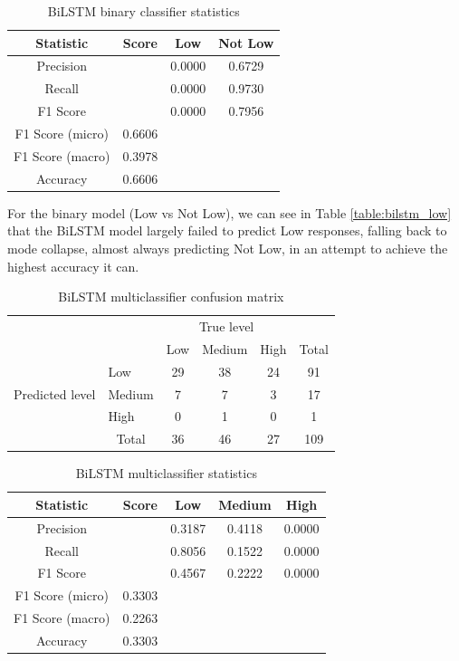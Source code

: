 \documentclass[12pt, a4paper]{article}
\begin{document}
\begin{table}[ht]
\centering
\begin{tabular}{||c c c c||} 
 \hline
 Statistic & Score & Low & Not Low  \\ [0.5ex] 
 \hline\hline
 Precision &  & 0.0000 & 0.6729 \\ 
 Recall & & 0.0000 & 0.9730 \\
 F1 Score &  & 0.0000 & 0.7956 \\
 F1 Score (micro) & 0.6606 & & \\
 F1 Score (macro)  & 0.3978 & &  \\ 
 Accuracy  & 0.6606 & & \\ [1ex] 
 \hline
\end{tabular}
\caption{BiLSTM binary classifier statistics}
\label{table:bilstmstat_low}
\end{table}

For the binary model (Low vs Not Low), we can see in Table \ref{table:bilstm_low} that the BiLSTM model largely failed to predict Low responses, falling back to mode collapse, almost always predicting Not Low, in an attempt to achieve the highest accuracy it can.

\begin{table}[ht]
\centering
\begin{tabular}{l|l|c|c|c|c}
\multicolumn{2}{c}{}&\multicolumn{3}{c}{True level}&\\
\cline{3-5}
\multicolumn{2}{c|}{}&Low&Medium&High&\multicolumn{1}{c}{Total}\\
\cline{2-5}
\multirow{3}{*}{Predicted level}& Low & 29 & 38 & 24 & 91\\
\cline{2-5}
& Medium & 7 & 7 & 3 & 17\\
\cline{2-5}
& High & 0 & 1 & 0 & 1\\
\cline{2-5}
\multicolumn{1}{c}{} & \multicolumn{1}{c}{Total} & \multicolumn{1}{c}{36} & \multicolumn{    1}{c}{46} & \multicolumn{    1}{c}{27} & \multicolumn{1}{c}{109}\\
\end{tabular}

\caption{BiLSTM multiclassifier confusion matrix}
\label{table:bilstm}
\end{table}

\begin{table}[ht]
\centering
\begin{tabular}{||c c c c c||} 
 \hline
 Statistic & Score & Low & Medium & High  \\ [0.5ex] 
 \hline\hline
 Precision &  & 0.3187 & 0.4118 & 0.0000 \\ 
 Recall & & 0.8056 & 0.1522  & 0.0000\\
 F1 Score &  & 0.4567 & 0.2222  & 0.0000\\
 F1 Score (micro) & 0.3303 & & & \\
 F1 Score (macro)  & 0.2263 & & & \\ 
 Accuracy  & 0.3303 & & & \\ [1ex] 
 \hline
\end{tabular}
\caption{BiLSTM multiclassifier statistics}
\label{table:bilstmstat}
\end{table}
\end{document}

